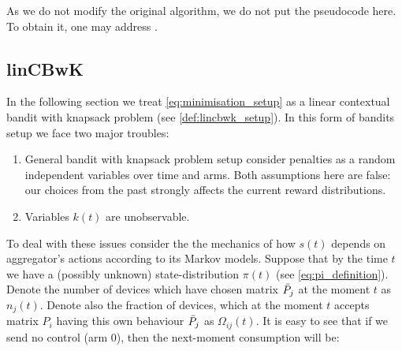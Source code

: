 As we do not modify the original algorithm, we do not put the pseudocode here. To obtain it, one may address \cite{Badanidiyuru2013}. 

\subsection{linCBwK}

In the following section we treat \ref{eq:minimisation_setup} as a linear contextual bandit with knapsack problem (see \ref{def:lincbwk_setup}). In this form of bandits setup we face two major troubles: 




\begin{enumerate}
    \item General bandit with knapsack problem setup  consider penalties as a random independent variables over time and arms. Both assumptions here are false: our choices from the past strongly affects the current reward distributions.
    \item Variables $k(t)$ are unobservable.
\end{enumerate} 

To deal with these issues consider the the mechanics of how $s(t)$ depends on aggregator's actions according to its Markov models. Suppose that by the time $t$ we have a (possibly unknown) state-distribution $\pi(t)$ (see \ref{eq:pi_definition}). Denote the number of devices which have chosen matrix ${\bar P}_j$ at the moment $t$ as $n_j(t)$. Denote also the fraction of devices, which at the moment $t$ accepts matrix $P_i$ having this own behaviour ${\bar P}_j$ as $\Omega_{ij}(t)$. It is easy to see that if we send no control (arm $0$), then the next-moment consumption will be:

